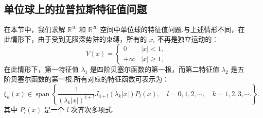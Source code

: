 \subsection{单位球上的拉普拉斯特征值问题}\label{sec:10dball}
在本节中，我们求解 $\mathbb{R}^{10}$ 和 $\mathbb{R}^{20}$ 空间中单位球的特征值问题.与上述情形不同，在此情形下，由于受到无限深势阱的束缚，所有的 $x_{i}$ 不再是独立运动的：
\begin{equation*}
V(x)=\left\{
\begin{array}{ll}
0&|x|<1,\\
+\infty&|x|\geq 1,
\end{array}\right.
\end{equation*}
在此情形下，第一特征值 $\lambda_{1}$ 是四阶贝塞尔函数的第一根，而第二特征值 $\lambda_{2}$ 是五阶贝塞尔函数的第一根.所有对应的特征函数可表示为：
\begin{equation*}
\xi_{k}(x)\in\mathop{span}\left\{ \frac{1}{\left(\lambda_{k}|x|\right)^{4+l}}J_{4+l}(\lambda_{k}|x|)P_{l}(x),\quad l=0,1,2,\cdots, \quad k=1,2,3,\cdots .\right\}.
\end{equation*}
其中 $P_{l}(x)$ 是一个 $l$ 次齐次多项式.

